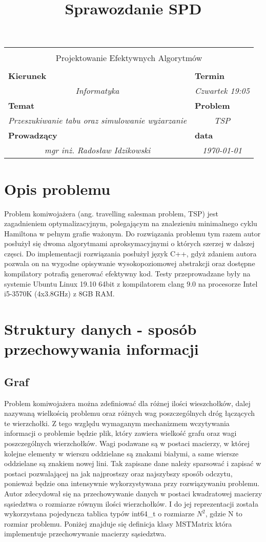 \documentclass[polish,polish,a4paper]{article}
\title{Sprawozdanie SPD}
\newcommand{\name}[1]{\sffamily\bfseries\scriptsize #1}
\newcommand{\frontpage}[8]{

\vspace{2cm}

\begin{tabular}{|p{0.72\textwidth}|p{0.28\textwidth}|}
\hline
\multicolumn{2}{|c|}{}\\
\multicolumn{2}{|c|}{{\LARGE #1}}\\
\multicolumn{2}{|c|}{}\\
\hline
\name{Kierunek} & \name{Termin}\\
\multicolumn{1}{|c|}{\textit{#2}} & \multicolumn{1}{|c|}{\textit{#3}} \\
\hline
\name{Temat} & \name{Problem}\\
\multicolumn{1}{|c|}{\textit{#4}} & \multicolumn{1}{|c|}{\textit{#5}} \\
\hline
\name{Prowadzący} & \name{data}\\
\multicolumn{1}{|c|}{\textit{mgr inż. Radosław Idzikowski}} & \multicolumn{1}{|c|}{\textit{#6}} \\
\hline
\end{tabular}

}
\begin{document}
\frontpage{Projektowanie Efektywnych Algorytmów}{Informatyka}{Czwartek 19:05}{Przeszukiwanie tabu oraz simulowanie wyżarzanie}{TSP}{\today}
\pagestyle{empty}
\newpage

\section{Opis problemu}

Problem komiwojażera (ang. travelling salesman problem, TSP) jest zagadnieniem optymalizacyjnym, polegającym na znalezieniu minimalnego cyklu Hamiltona w pełnym grafie ważonym. Do rozwiązania problemu tym razem autor posłużył się dwoma algorytmami aproksymacyjnymi o których szerzej w dalszej częsci.
Do implementacji rozwiązania posłużył język C++, gdyż zdaniem autora pozwala on na wygodne opisywanie wysokopoziomowej abstrakcji oraz dostępne kompilatory
potrafią generować efektywny kod. Testy przeprowadzane były na systemie Ubuntu Linux 19.10 64bit z kompilatorem clang 9.0 na procesorze Intel i5-3570K (4x3.8GHz) z 8GB RAM.

\section{Struktury danych - sposób przechowywania informacji}

\subsection{Graf}

Problem komiwojażera można zdefiniować dla różnej ilości wieszchołków, dalej nazywaną wielkością problemu oraz różnych wag poszczególnych dróg łączących te wierzchołki.
Z tego względu wymaganym mechanizmem wczytywania informacji o problemie będzie plik, który zawiera wielkość grafu oraz wagi poszczególnych wierzchołków.
Wagi podawane są w postaci macierzy, w której kolejne elementy w wierszu oddzielane są znakami białymi, a same wiersze oddzielane są znakiem nowej lini.
Tak zapisane dane należy sparsować i zapisać w postaci pozwalającej na jak najprostszy oraz najszybszy sposób odczytu, ponieważ będzie ona intensywnie wykorzystywana przy rozwiązywaniu problemu.
Autor zdecydował się na przechowywanie danych w postaci kwadratowej macierzy sąsiedztwa o rozmiarze równym ilości wierzchołków.
I do jej reprezentacji została wykorzystana pojedyncza tablica typów int64\_t o rozmiarze $N^{2}$, gdzie N to rozmiar problemu.
Poniżej znajduje się definicja klasy MSTMatrix która implementuje przechowywanie macierzy sąsiedztwa.
\end{document}

